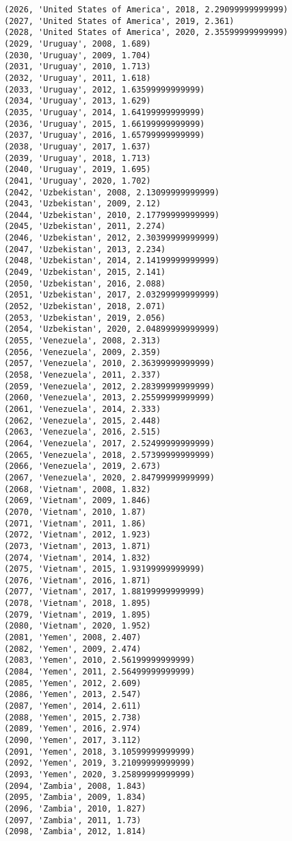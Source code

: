\documentclass[11pt]{article}
\begin{document}
\begin{Verbatim}[commandchars=\\\{\}]
(2026, 'United States of America', 2018, 2.29099999999999)
(2027, 'United States of America', 2019, 2.361)
(2028, 'United States of America', 2020, 2.35599999999999)
(2029, 'Uruguay', 2008, 1.689)
(2030, 'Uruguay', 2009, 1.704)
(2031, 'Uruguay', 2010, 1.713)
(2032, 'Uruguay', 2011, 1.618)
(2033, 'Uruguay', 2012, 1.63599999999999)
(2034, 'Uruguay', 2013, 1.629)
(2035, 'Uruguay', 2014, 1.64199999999999)
(2036, 'Uruguay', 2015, 1.66199999999999)
(2037, 'Uruguay', 2016, 1.65799999999999)
(2038, 'Uruguay', 2017, 1.637)
(2039, 'Uruguay', 2018, 1.713)
(2040, 'Uruguay', 2019, 1.695)
(2041, 'Uruguay', 2020, 1.702)
(2042, 'Uzbekistan', 2008, 2.13099999999999)
(2043, 'Uzbekistan', 2009, 2.12)
(2044, 'Uzbekistan', 2010, 2.17799999999999)
(2045, 'Uzbekistan', 2011, 2.274)
(2046, 'Uzbekistan', 2012, 2.30399999999999)
(2047, 'Uzbekistan', 2013, 2.234)
(2048, 'Uzbekistan', 2014, 2.14199999999999)
(2049, 'Uzbekistan', 2015, 2.141)
(2050, 'Uzbekistan', 2016, 2.088)
(2051, 'Uzbekistan', 2017, 2.03299999999999)
(2052, 'Uzbekistan', 2018, 2.071)
(2053, 'Uzbekistan', 2019, 2.056)
(2054, 'Uzbekistan', 2020, 2.04899999999999)
(2055, 'Venezuela', 2008, 2.313)
(2056, 'Venezuela', 2009, 2.359)
(2057, 'Venezuela', 2010, 2.36399999999999)
(2058, 'Venezuela', 2011, 2.337)
(2059, 'Venezuela', 2012, 2.28399999999999)
(2060, 'Venezuela', 2013, 2.25599999999999)
(2061, 'Venezuela', 2014, 2.333)
(2062, 'Venezuela', 2015, 2.448)
(2063, 'Venezuela', 2016, 2.515)
(2064, 'Venezuela', 2017, 2.52499999999999)
(2065, 'Venezuela', 2018, 2.57399999999999)
(2066, 'Venezuela', 2019, 2.673)
(2067, 'Venezuela', 2020, 2.84799999999999)
(2068, 'Vietnam', 2008, 1.832)
(2069, 'Vietnam', 2009, 1.846)
(2070, 'Vietnam', 2010, 1.87)
(2071, 'Vietnam', 2011, 1.86)
(2072, 'Vietnam', 2012, 1.923)
(2073, 'Vietnam', 2013, 1.871)
(2074, 'Vietnam', 2014, 1.832)
(2075, 'Vietnam', 2015, 1.93199999999999)
(2076, 'Vietnam', 2016, 1.871)
(2077, 'Vietnam', 2017, 1.88199999999999)
(2078, 'Vietnam', 2018, 1.895)
(2079, 'Vietnam', 2019, 1.895)
(2080, 'Vietnam', 2020, 1.952)
(2081, 'Yemen', 2008, 2.407)
(2082, 'Yemen', 2009, 2.474)
(2083, 'Yemen', 2010, 2.56199999999999)
(2084, 'Yemen', 2011, 2.56499999999999)
(2085, 'Yemen', 2012, 2.609)
(2086, 'Yemen', 2013, 2.547)
(2087, 'Yemen', 2014, 2.611)
(2088, 'Yemen', 2015, 2.738)
(2089, 'Yemen', 2016, 2.974)
(2090, 'Yemen', 2017, 3.112)
(2091, 'Yemen', 2018, 3.10599999999999)
(2092, 'Yemen', 2019, 3.21099999999999)
(2093, 'Yemen', 2020, 3.25899999999999)
(2094, 'Zambia', 2008, 1.843)
(2095, 'Zambia', 2009, 1.834)
(2096, 'Zambia', 2010, 1.827)
(2097, 'Zambia', 2011, 1.73)
(2098, 'Zambia', 2012, 1.814)

\end{Verbatim}
\end{document}
